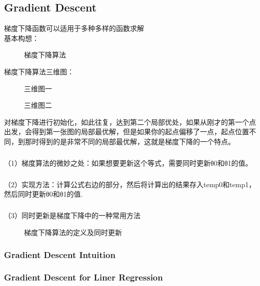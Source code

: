 \documentclass{article}
\begin{document}
\begin{CJK}{UTF8}{gbsn}
\subsection{Gradient Descent}
梯度下降函数可以适用于多种多样的函数求解\\
基本构想：
\begin{figure}[H]
\caption{梯度下降算法}
\label{fig:24}
\end{figure}
梯度下降算法三维图：
\begin{figure}[H]
\caption{三维图一}
\label{fig:25}
\end{figure}
\begin{figure}[H]
\caption{三维图二}
\label{fig:26}
\end{figure}
对梯度下降进行初始化，如此往复，达到第二个局部优处，如果从刚才的第一个点出发，会得到第一张图的局部最优解，但是如果你的起点偏移了一点，起点位置不同，到那时得到的是非常不同的局部最优解，这就是梯度下降的一个特点。
\subparagraph*{}
（1）梯度算法的微妙之处：如果想要更新这个等式，需要同时更新θ0和θ1的值。
\subparagraph*{}
（2）实现方法：计算公式右边的部分，然后将计算出的结果存入temp0和temp1，然后同时更新θ0和θ1的值.
\subparagraph*{}
（3）同时更新是梯度下降中的一种常用方法
\begin{figure}[H]
\caption{梯度下降算法的定义及同时更新}
\label{fig:28}
\end{figure}
\subsubsection{Gradient Descent Intuition}

\subsubsection{Gradient Descent for Liner Regression}


\end{CJK}
\end{document}
